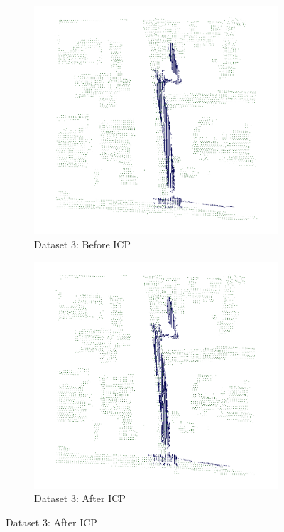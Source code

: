 \documentclass[11pt]{article}
\begin{document}
    \begin{figure}[p]
        \centering
        \begin{subfigure}{0.45\textwidth}
            \centering
            \includegraphics[width=\linewidth]{images/full/ply/5_1_2_before_icp}
            \caption{Dataset 3: Before ICP}
        \end{subfigure}
        \hfill
        \begin{subfigure}{0.45\textwidth}
            \centering
            \includegraphics[width=\linewidth]{images/full/ply/5_1_2_after_icp}
            \caption{Dataset 3: After ICP}
        \end{subfigure}


\end{figure}
\end{document}
